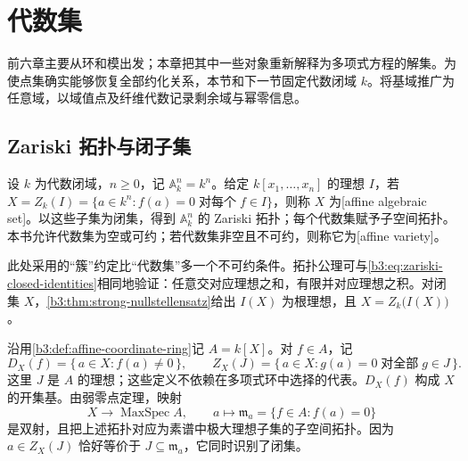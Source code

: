 
\section{代数集}
\label{b3:sec:0701}

前六章主要从环和模出发；本章把其中一些对象重新解释为多项式方程的解集。为使点集确实能够恢复全部约化关系，本节和下一节固定代数闭域 \(k\)。将基域推广为任意域，以域值点及纤维代数记录剩余域与幂零信息。

\subsection{Zariski 拓扑与闭子集}
\label{b3:subsec:0701:01}

\begin{definition}\label{b3:def:affine-algebraic-set}
	设 \(k\) 为代数闭域，\(n\ge0\)，记 \(\mathbb A_k^n=k^n\)。给定 \(k[x_1,\ldots,x_n]\) 的理想 \(I\)，若 \(X=Z_k(I)=\{a\in k^n:f(a)=0\;\text{对每个}\;f\in I\}\)，则称 \(X\) 为[affine algebraic set]。以这些子集为闭集，得到 \(\mathbb A_k^n\) 的 Zariski 拓扑；每个代数集赋予子空间拓扑。本书允许代数集为空或可约；若代数集非空且不可约，则称它为[affine variety]。
\end{definition}

此处采用的“簇”约定比“代数集”多一个不可约条件。拓扑公理可与\eqref{b3:eq:zariski-closed-identities}相同地验证：任意交对应理想之和，有限并对应理想之积。对闭集 \(X\)，\cref{b3:thm:strong-nullstellensatz}给出 \(I(X)\) 为根理想，且 \(X=Z_k\bigl(I(X)\bigr)\)。

\ProseParagraphBreak
沿用\cref{b3:def:affine-coordinate-ring}记 \(A=k[X]\)。对 \(f\in A\)，记
\[
	D_X(f)=\bigl\{\,a\in X:f(a)\ne0\,\bigr\},\qquad Z_X(J)=\bigl\{\,a\in X:g(a)=0\;\text{对全部}\;g\in J\,\bigr\}.
\]
这里 \(J\) 是 \(A\) 的理想；这些定义不依赖在多项式环中选择的代表。\(D_X(f)\) 构成 \(X\) 的开集基。由弱零点定理，映射
\begin{equation}\label{b3:eq:closed-points-affine}
	X\longrightarrow\operatorname{MaxSpec}A, \qquad a\longmapsto\mathfrak m_a=\bigl\{f\in A:f(a)=0\bigr\}
\end{equation}
是双射，且把上述拓扑对应为素谱中极大理想子集的子空间拓扑。因为 \(a\in Z_X(J)\) 恰好等价于 \(J\subseteq\mathfrak m_a\)，它同时识别了闭集。

